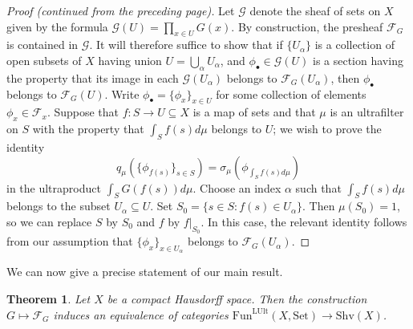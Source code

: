 \documentclass[11pt]{article}
\theoremstyle{plain}
\newtheorem{theorem}{Theorem}
\theoremstyle{definition}
\begin{document}

\begin{proof}[Proof (continued from the preceding page)]
Let $\mathscr{G}$ denote the sheaf of sets on $X$ given by the formula $\mathscr{G}(U) = \prod_{x \in U} G(x)$. By construction, the presheaf $\mathscr{F}_G$ is contained in $\mathscr{G}$. It will therefore suffice to show that if $\{U_\alpha\}$ is a collection of open subsets of $X$ having union $U = \bigcup_\alpha U_\alpha$, and $\phi_\bullet \in \mathscr{G}(U)$ is a section having the property that its image in each $\mathscr{G}(U_\alpha)$ belongs to $\mathscr{F}_G(U_\alpha)$, then $\phi_\bullet$ belongs to $\mathscr{F}_G(U)$. Write $\phi_\bullet = \{\phi_x\}_{x \in U}$ for some collection of elements $\phi_x \in \mathscr{F}_x$. Suppose that $f : S \to U \subseteq X$ is a map of sets and that $\mu$ is an ultrafilter on $S$ with the property that $\int_S f(s)d\mu$ belongs to $U$; we wish to prove the identity
\[
q_\mu(\{\phi_{f(s)}\}_{s \in S}) = \sigma_\mu(\phi_{\int_S f(s)d\mu})
\]
in the ultraproduct $\int_S G(f(s))d\mu$. Choose an index $\alpha$ such that $\int_S f(s)d\mu$ belongs to the subset $U_\alpha \subseteq U$. Set $S_0 = \{s \in S : f(s) \in U_\alpha\}$. Then $\mu(S_0) = 1$, so we can replace $S$ by $S_0$ and $f$ by $f|_{S_0}$. In this case, the relevant identity follows from our assumption that $\{\phi_x\}_{x \in U_\alpha}$ belongs to $\mathscr{F}_G(U_\alpha)$.
\end{proof}

We can now give a precise statement of our main result.

\renewcommand{\thetheorem}{3.4.4}
\begin{theorem}
Let $X$ be a compact Hausdorff space. Then the construction $G \mapsto \mathscr{F}_G$ induces an equivalence of categories $\mathrm{Fun}^{\mathrm{LUlt}}(X,\mathrm{Set}) \to \mathrm{Shv}(X)$.
\end{theorem}
\end{document}
